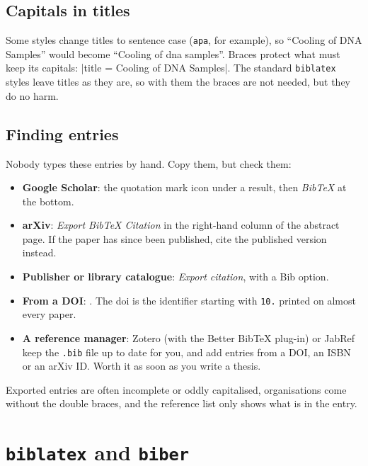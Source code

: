 
\subsection{Capitals in titles}

Some styles change titles to sentence case (\texttt{apa}, for example),
so \enquote{Cooling of DNA Samples} would become \enquote{Cooling of dna samples}.
Braces protect what must keep its capitals: \code|title = {Cooling of {DNA} Samples}|.
The standard \texttt{biblatex} styles leave titles as they are,
so with them the braces are not needed, but they do no harm.

\subsection{Finding entries}

Nobody types these entries by hand.
Copy them, but check them:

\begin{itemize}
    \item \textbf{Google Scholar}: the quotation mark icon under a result, then \textit{BibTeX} at the bottom.
    \item \textbf{arXiv}: \textit{Export BibTeX Citation} in the right-hand column of the abstract page.
        If the paper has since been published, cite the published version instead.
    \item \textbf{Publisher or library catalogue}: \textit{Export citation}, with a Bib option.
    \item \textbf{From a DOI}: .
        The \gls{doi} is the identifier starting with \texttt{10.} printed on almost every paper.
    \item \textbf{A reference manager}: Zotero (with the Better BibTeX plug-in) or JabRef
        keep the \texttt{.bib} file up to date for you,
        and add entries from a DOI, an ISBN or an arXiv ID.
        Worth it as soon as you write a thesis.
\end{itemize}

Exported entries are often incomplete or oddly capitalised,
organisations come without the double braces,
and the reference list only shows what is in the entry.

\section{\texttt{biblatex} and \texttt{biber}}\label{sec:biber}

